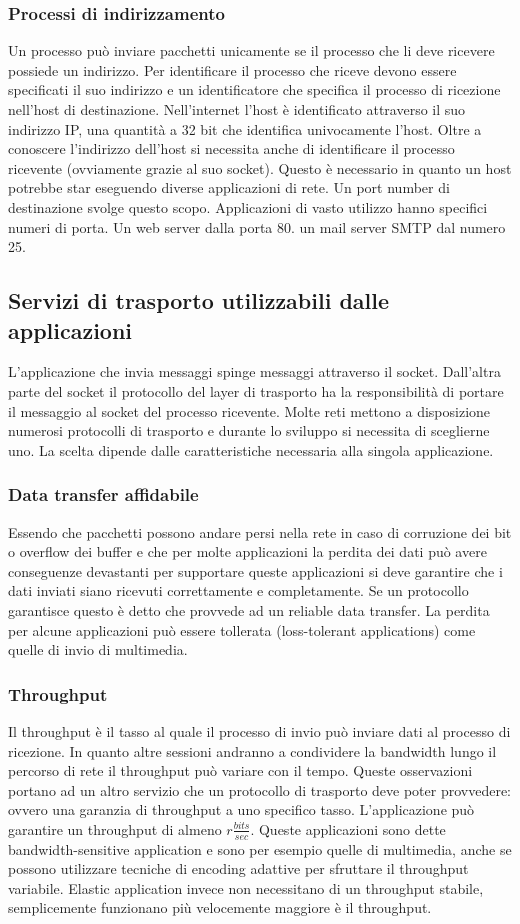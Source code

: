 \subsubsection{Processi di indirizzamento}
Un processo pu\`o inviare pacchetti unicamente se il processo che li deve ricevere possiede un indirizzo. Per identificare il processo che riceve devono essere specificati il suo indirizzo e un identificatore che 
specifica il processo di ricezione nell'host di destinazione. Nell'internet l'host \`e identificato attraverso il suo indirizzo IP, una quantit\`a a 32 bit che identifica univocamente l'host. Oltre a conoscere l'indirizzo
dell'host si necessita anche di identificare il processo ricevente (ovviamente grazie al suo socket). Questo \`e necessario in quanto un host potrebbe star eseguendo diverse applicazioni di rete. Un port number
di destinazione svolge questo scopo. Applicazioni di vasto utilizzo hanno specifici numeri di porta. Un web server dalla porta 80. un mail server SMTP dal numero 25. 
\subsection{Servizi di trasporto utilizzabili dalle applicazioni}
L'applicazione che invia messaggi spinge messaggi attraverso il socket. Dall'altra parte del socket il protocollo del layer di trasporto ha la responsibilit\`a di portare il messaggio al socket del processo ricevente.
Molte reti mettono a disposizione numerosi protocolli di trasporto e durante lo sviluppo si necessita di sceglierne uno. La scelta dipende dalle caratteristiche necessaria alla singola applicazione.
\subsubsection{Data transfer affidabile}
Essendo che pacchetti possono andare persi nella rete in caso di corruzione dei bit o overflow dei buffer e che per molte applicazioni la perdita dei dati pu\`o avere conseguenze devastanti per supportare queste
applicazioni si deve garantire che i dati inviati siano ricevuti correttamente e completamente. Se un protocollo garantisce questo \`e detto che provvede ad un reliable data transfer. La perdita per alcune 
applicazioni pu\`o essere tollerata (loss-tolerant applications) come quelle di invio di multimedia. 
\subsubsection{Throughput}
Il throughput \`e il tasso al quale il processo di invio pu\`o inviare dati al processo di ricezione. In quanto altre sessioni andranno a condividere la bandwidth lungo il percorso di rete il throughput pu\`o variare 
con il tempo. Queste osservazioni portano ad un altro servizio che un protocollo di trasporto deve poter provvedere: ovvero una garanzia di throughput a uno specifico tasso. L'applicazione pu\`o garantire un 
throughput di almeno $r\frac{bits}{sec}$. Queste applicazioni sono dette bandwidth-sensitive application e sono per esempio quelle di multimedia, anche se possono utilizzare tecniche di encoding adattive
per sfruttare il throughput variabile. Elastic application invece non necessitano di un throughput stabile, semplicemente funzionano pi\`u velocemente maggiore \`e il throughput. 
